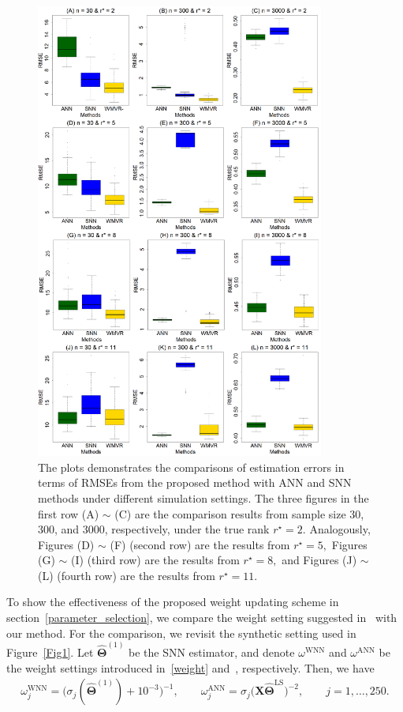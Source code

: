 \documentclass[alpha-refs]{wiley-article}
\begin{document}
\begin{figure}[htbp!]
\includegraphics[width=95mm]{Figure/S5_P1.pdf}
\centering
\caption{The plots demonstrates the comparisons of estimation errors in terms of RMSEs from the proposed method with ANN and SNN methods under different simulation settings. 
The three figures in the first row (A) $\sim$ (C) are the comparison results from sample size 30, 300, and 3000, respectively, under the true rank $r^{\star} = 2$. 
Analogously, Figures (D) $\sim$ (F) (second row) are the results from $r^{\star} = 5,$ Figures (G) $\sim$ (I) (third row) are the results from $r^{\star} = 8,$ and Figures (J) $\sim$ (L) (fourth row) are the results from $r^{\star} = 11.$  }
\label{Fig_S4_Ex1}
\end{figure}

To show the effectiveness of the proposed weight updating scheme in section~\ref{parameter_selection},
we compare the weight setting suggested in~\citet{chen2013reduced} with our method.
For the comparison, we revisit the synthetic setting used in Figure~\ref{Fig1}.
Let $\widehat{\boldsymbol{\Theta}}^{(1)}$ be the SNN estimator, and denote $\omega^{\text{WNN}}$
and $\omega^{\text{ANN}}$ be the weight settings introduced in~\eqref{weight} and~\citet{chen2013reduced}, respectively.
Then, we have
\begin{align} \label{weight_comp}
    \omega_{j}^{\text{WNN}} =
    \big(\sigma_{j}(\widehat{\boldsymbol{\Theta}}^{(1)})+10^{-3}\big)^{-1},
    \qquad
    \omega_{j}^{\text{ANN}} =
    \sigma_{j}\big( \boldsymbol{X}\widehat{\boldsymbol{\Theta}}^{\text{LS}} \big)^{-2},
    \qquad j=1,\dots,250.
\end{align}
\end{document}
